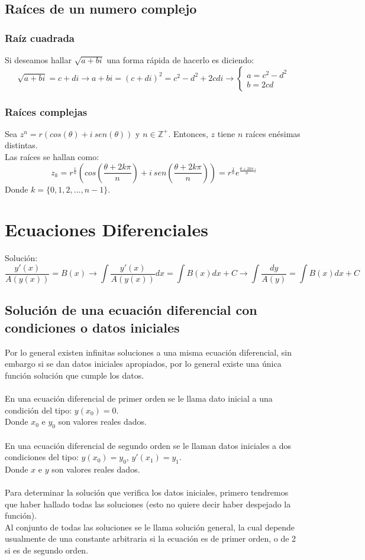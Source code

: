 \documentclass{report}
\begin{document}
\section{Raíces de un numero complejo}
\subsection{Raíz cuadrada}
Si deseamos hallar $\sqrt{a+bi}$ una forma rápida de hacerlo es diciendo: $$\sqrt{a+bi}=c+di \rightarrow a+bi=(c+di)^2=c^2-d^2+2cdi\rightarrow \begin{cases}a=c^{2} -d^{2}\\b=2cd\end{cases}$$
\newpage \subsection{Raíces complejas}
Sea $z^n=r(cos(\theta)+i\ sen(\theta))$ y $n\in \mathbb{Z}^{+}$. Entonces, $z$ tiene $n$ raíces enésimas distintas.\\
Las raíces se hallan como: $$z_k=r^{\frac{1}{n}}\left(cos\left(\frac{\theta +2k\pi}{n}\right)+i\ sen\left(\frac{\theta + 2k\pi}{n}\right)\right)=r^{\frac{1}{n}}e^{\frac{\theta + 2k\pi}{n}i}$$
Donde $k=\{0,1,2,\dots,n-1\}$.
\newpage\chapter{Ecuaciones Diferenciales}
Solución: $$\frac{y'(x)}{A(y(x))}=B(x)\rightarrow \int \frac{y'(x)}{A(y(x))} dx=\int B(x)dx+C\rightarrow \int \frac{dy}{A(y)}=\int B(x)dx+C$$
\section{Solución de una ecuación diferencial con condiciones o datos iniciales}
Por lo general existen infinitas soluciones a una misma ecuación diferencial, sin embargo si se dan datos iniciales apropiados, por lo general existe una única función solución que cumple los datos.\\\\
En una ecuación diferencial de primer orden se le llama dato inicial a una condición del tipo: $y(x_0)=0$.\\
Donde $x_0$ e $y_0$ son valores reales dados.\\\\
En una ecuación diferencial de segundo orden se le llaman datos iniciales a dos condiciones del tipo: $y(x_0)=y_0$, $y'(x_1)=y_1$.\\
Donde $x$ e $y$ son valores reales dados.\\\\
Para determinar la solución que verifica los datos iniciales, primero tendremos que haber hallado todas las soluciones (esto no quiere decir haber despejado la función).\\
Al conjunto de todas las soluciones se le llama solución general, la cual depende usualmente de una constante arbitraria si la ecuación es de primer orden, o de 2 si es de segundo orden.
\end{document}
